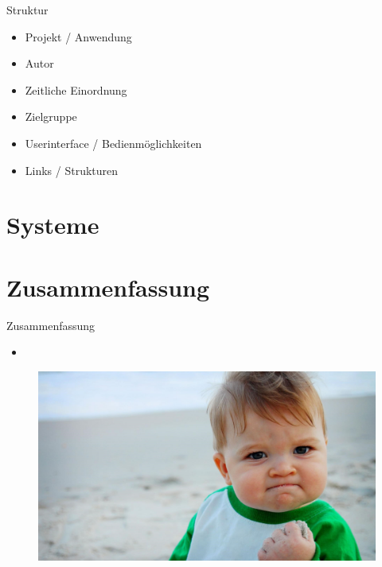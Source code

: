 \documentclass{beamer}
\begin{document}
\begin{frame}{Struktur}
\begin{itemize}
	\item Projekt / Anwendung
	\item Autor
	\item Zeitliche Einordnung
	\item Zielgruppe
	\item Userinterface / Bedienmöglichkeiten
	\item Links / Strukturen
\end{itemize}
\end{frame}

\section{Systeme}







%
%
%

\section{Zusammenfassung}
\begin{frame}{Zusammenfassung}
	\begin{itemize}
		\item 
	\end{itemize}
\end{frame}

\begin{frame}{}
	\begin{figure}[htbp]
		\centering
		\includegraphics[width=1.0\textwidth]{images/success}
	\end{figure}
\end{frame}
\end{document}
